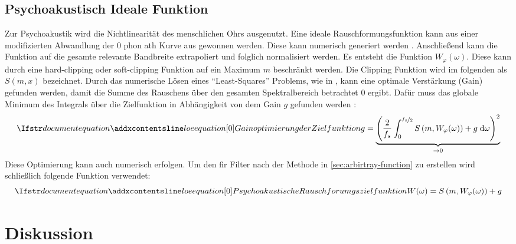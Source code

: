 \subsection{Psychoakustisch Ideale Funktion}

Zur Psychoakustik wird die Nichtlinearität des menschlichen Ohrs ausgenutzt.
Eine ideale Rauschformungsfunktion kann aus einer modifizierten Abwandlung der $0$ \gls{phon} \gls{ath} Kurve aus  gewonnen werden.
Diese kann numerisch generiert werden \autocite[S. 2 ff.]{iso226}\autocite{iso226matlab}.
Anschließend kann die Funktion auf die gesamte relevante Bandbreite extrapoliert und folglich normalisiert werden.
Es entsteht die Funktion $W_\varphi(\omega)$.
Diese kann durch eine \gls{hard-clipping} oder \gls{soft-clipping} Funktion auf ein Maximum $m$ beschränkt werden.
Die Clipping Funktion wird im folgenden als $S(m, x)$ bezeichnet.
Durch das numerische Lösen eines \foreignquote{english}{Least-Squares} Problems, wie in \citeauthor{noise-shaping} \autocite{noise-shaping}, kann eine optimale Verstärkung (Gain) gefunden werden, damit die Summe des Rauschens über den gesamten Spektralbereich betrachtet 0 ergibt.
Dafür muss das globale Minimum des Integrals über die Zielfunktion in Abhängigkeit von dem Gain $g$ gefunden werden \autocite[S. 149]{noise-shaping}:
\begin{equation}
\setequationentry{Gainoptimierung der Zielfunktion}
g = \underbrace{\left( \frac{2}{f_s} \int_{0}^{\nicefrac{f_s}{2}} S \left(m , W_\varphi(\omega)\right) + g\; \text{d} \omega \right)^2}_{\to 0}
\label{eq:optimize}
\end{equation}
Diese Optimierung kann auch numerisch erfolgen.
Um den \gls{fir} Filter nach der Methode in \autoref{sec:arbirtray-function} zu erstellen wird schließlich folgende Funktion verwendet:
\begin{equation}
\setequationentry{Psychoakustische Rauschforumgszielfunktion}
W(\omega) = S \left( m, W_\varphi(\omega) \right) + g
\end{equation}

\section{Diskussion}

